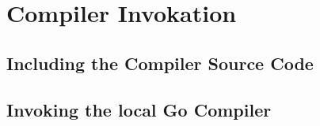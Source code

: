 \chapter{Compiler Invokation}

\section{Including the Compiler Source Code}
\section{Invoking the local Go Compiler}
